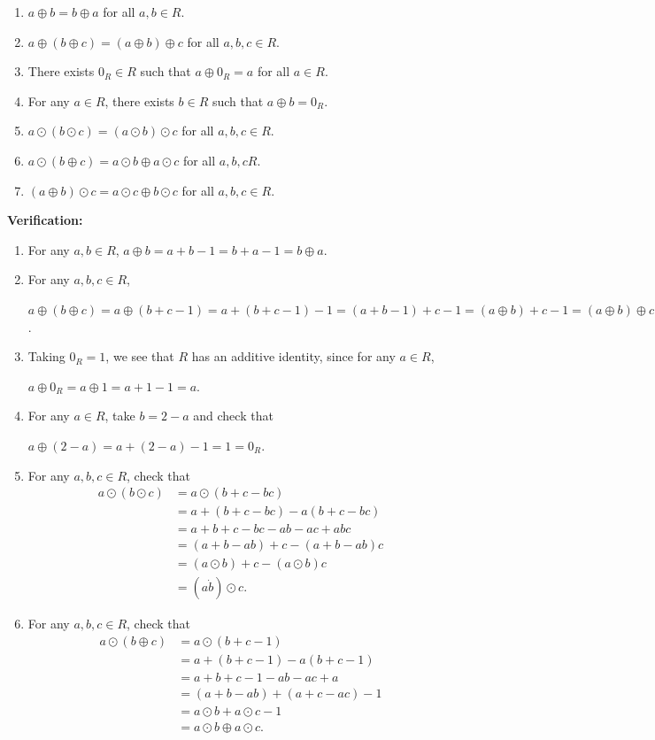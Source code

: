 \documentclass[11pt,fleqn,dvipsnames,usenames]{article}
\begin{document}
\begin{enumerate}[1.]
\begin{enumerate}[(1)]
\item $a \oplus b  = b \oplus a$ for all $a,b\in R$.
\item $a \oplus (b \oplus c) = (a \oplus b) \oplus c$ for all $a,b,c \in R$.
\item There exists $0_{R}\in R$ such that $a \oplus 0_{R} = a$ for all $a\in R$.
\item For any $a\in R$, there exists $b\in R$ such that $a \oplus b = 0_{R}$.
\item $a\odot(b\odot c) = (a\odot b)\odot c$ for all $a,b,c \in R$.
\item $a\odot(b\oplus c) = a\odot b \oplus a\odot c$ for all $a,b,c R$.
\item $(a\oplus b)\odot c = a\odot c \oplus b\odot c$ for all $a,b,c\in R$.
\end{enumerate}

\textbf{Verification:}
\begin{enumerate}[(1)]
\item For any $a,b\in R$, $a\oplus b = a + b - 1 = b + a - 1 = b\oplus a$.
\item For any $a,b,c\in R$,
\begin{center}
$a\oplus(b\oplus c) = a\oplus(b + c - 1) = a + (b + c - 1) - 1 = (a + b - 1) + c - 1 = (a\oplus b) + c - 1 = (a\oplus b)\oplus c$.
\end{center}

\item Taking $0_{R} = 1$, we see that $R$ has an additive identity, since for any $a\in R$,
\begin{center}
$a\oplus 0_{R} = a\oplus 1 = a + 1 - 1 = a$.
\end{center}

\item For any $a\in R$, take $b = 2 - a$ and check that
\begin{center}
$a\oplus(2-a) = a + (2 - a) - 1 = 1 = 0_{R}$.
\end{center}

\item For any $a,b,c\in R$, check that
\begin{align*}
a\odot(b\odot c) &= a\odot(b + c - bc)\\
&= a + (b + c - bc) - a(b+c - bc)\\
&= a + b + c - bc - ab - ac + abc\\
&= (a + b - ab) + c - (a + b - ab)c\\
&=(a\odot b) + c - (a\odot b)c\\
&= (a\dot b)\odot c.
\end{align*}
\item For any $a,b,c\in R$, check that
\begin{align*}
a\odot(b\oplus c) &= a\odot(b + c - 1)\\
&= a + (b + c - 1) - a(b + c - 1)\\
&= a + b + c - 1 - ab - ac + a\\
&= (a + b - ab) + (a + c - ac) - 1\\
&= a\odot b + a\odot c - 1\\
&= a\odot b \oplus a\odot c.
\end{align*}


\end{enumerate}
\end{enumerate}
\end{document}
